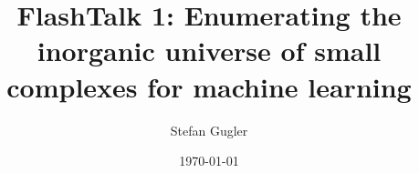\documentclass{beamer}
\title[FlashTalk 1]{FlashTalk 1:  Enumerating the inorganic universe of small complexes for machine learning} %
\author{Stefan Gugler} %
\institute[MIT] %
{
	Massachusetts Institute of Technology \\ %
	\medskip
	\textit{sgugler@mit.edu} %
}
\date{\today} %
\begin{document}
	
\begin{frame}
	\titlepage %
\end{frame}




\end{document}
